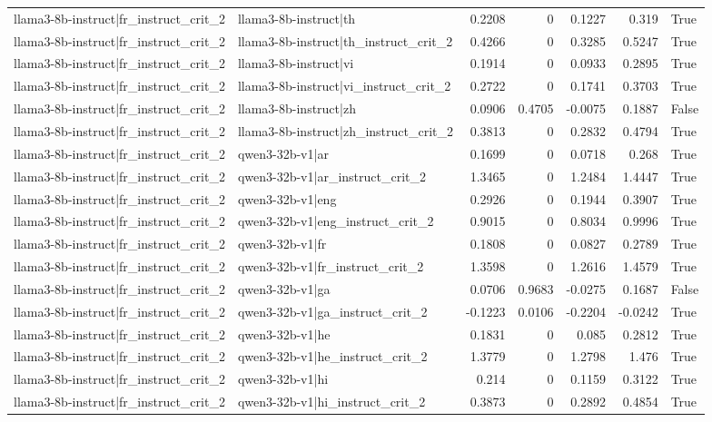 \begin{table}
\begin{tabular}{l l r r r r l}
llama3-8b-instruct|fr_instruct_crit_2 & llama3-8b-instruct|th & 0.2208 & 0 & 0.1227 & 0.319 & True \\
llama3-8b-instruct|fr_instruct_crit_2 & llama3-8b-instruct|th_instruct_crit_2 & 0.4266 & 0 & 0.3285 & 0.5247 & True \\
llama3-8b-instruct|fr_instruct_crit_2 & llama3-8b-instruct|vi & 0.1914 & 0 & 0.0933 & 0.2895 & True \\
llama3-8b-instruct|fr_instruct_crit_2 & llama3-8b-instruct|vi_instruct_crit_2 & 0.2722 & 0 & 0.1741 & 0.3703 & True \\
llama3-8b-instruct|fr_instruct_crit_2 & llama3-8b-instruct|zh & 0.0906 & 0.4705 & -0.0075 & 0.1887 & False \\
llama3-8b-instruct|fr_instruct_crit_2 & llama3-8b-instruct|zh_instruct_crit_2 & 0.3813 & 0 & 0.2832 & 0.4794 & True \\
llama3-8b-instruct|fr_instruct_crit_2 & qwen3-32b-v1|ar & 0.1699 & 0 & 0.0718 & 0.268 & True \\
llama3-8b-instruct|fr_instruct_crit_2 & qwen3-32b-v1|ar_instruct_crit_2 & 1.3465 & 0 & 1.2484 & 1.4447 & True \\
llama3-8b-instruct|fr_instruct_crit_2 & qwen3-32b-v1|eng & 0.2926 & 0 & 0.1944 & 0.3907 & True \\
llama3-8b-instruct|fr_instruct_crit_2 & qwen3-32b-v1|eng_instruct_crit_2 & 0.9015 & 0 & 0.8034 & 0.9996 & True \\
llama3-8b-instruct|fr_instruct_crit_2 & qwen3-32b-v1|fr & 0.1808 & 0 & 0.0827 & 0.2789 & True \\
llama3-8b-instruct|fr_instruct_crit_2 & qwen3-32b-v1|fr_instruct_crit_2 & 1.3598 & 0 & 1.2616 & 1.4579 & True \\
llama3-8b-instruct|fr_instruct_crit_2 & qwen3-32b-v1|ga & 0.0706 & 0.9683 & -0.0275 & 0.1687 & False \\
llama3-8b-instruct|fr_instruct_crit_2 & qwen3-32b-v1|ga_instruct_crit_2 & -0.1223 & 0.0106 & -0.2204 & -0.0242 & True \\
llama3-8b-instruct|fr_instruct_crit_2 & qwen3-32b-v1|he & 0.1831 & 0 & 0.085 & 0.2812 & True \\
llama3-8b-instruct|fr_instruct_crit_2 & qwen3-32b-v1|he_instruct_crit_2 & 1.3779 & 0 & 1.2798 & 1.476 & True \\
llama3-8b-instruct|fr_instruct_crit_2 & qwen3-32b-v1|hi & 0.214 & 0 & 0.1159 & 0.3122 & True \\
llama3-8b-instruct|fr_instruct_crit_2 & qwen3-32b-v1|hi_instruct_crit_2 & 0.3873 & 0 & 0.2892 & 0.4854 & True \\

\end{tabular}
\end{table}
